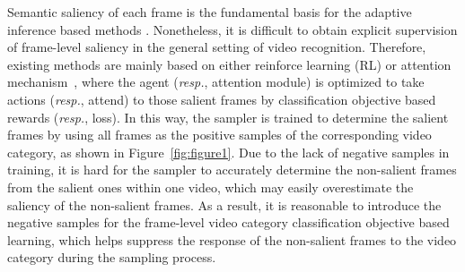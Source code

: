 \documentclass[runningheads]{llncs}
\newcommand{\figref}[1]{Figure~\ref{#1}}
\begin{document}
Semantic saliency of each frame is the fundamental basis for the adaptive inference based methods \cite{scsampler19,adamml}.  Nonetheless, it is difficult to obtain explicit supervision of frame-level saliency in the general setting of video recognition. Therefore, existing methods are mainly based on either reinforce learning (RL) or attention mechanism~\cite{adaframe,marl,arnet,smart2020}, 
where the agent (\textit{resp.}, attention module) is optimized to take actions (\textit{resp.}, attend) to those salient frames by classification objective based rewards (\textit{resp.}, loss).
In this way, the sampler is trained to determine the salient frames by using all frames as the positive samples of the corresponding video category, as shown in \figref{fig:figure1}. Due to the lack of negative samples in training, it is hard for the sampler to accurately determine the non-salient frames from the salient ones within one video, which may easily overestimate the saliency of the non-salient frames. As a result, it is reasonable to introduce the negative samples for the frame-level video category classification objective based learning, which helps suppress the response of the non-salient frames to the video category during the sampling process.
\end{document}
